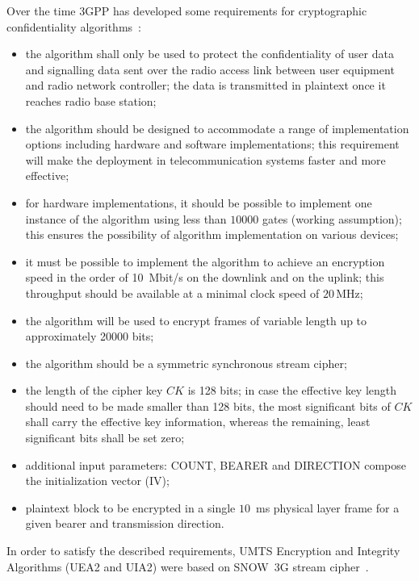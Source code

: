 Over the time 3GPP has developed some requirements for cryptographic
confidentiality algorithms~\cite{3gpp:uea2_doc5}:
\begin{itemize}
    \item the algorithm shall only be used to protect the confidentiality of user
        data and signalling data sent over the radio access link between user
        equipment and radio network controller; the data is
        transmitted in plaintext once it reaches radio base station;
    \item the algorithm should be designed to accommodate a range of implementation
        options including hardware and software implementations; this
        requirement will make the deployment in telecommunication systems faster
        and more effective;
    \item for hardware implementations, it should be possible to implement one
        instance of the algorithm using less than $10000$ gates (working
        assumption); this ensures the possibility of algorithm implementation on
        various devices;
    \item it must be possible to implement the algorithm to achieve an encryption
        speed in the order of 10~Mbit/s on the downlink and on the uplink; this
        throughput should be available at a minimal clock speed of 
        \mbox{$20 \, \text{MHz}$};  
    \item the algorithm will be used to encrypt frames
            of variable length up to approximately 20000 bits;
    \item the algorithm should be a symmetric synchronous stream cipher;
    \item the length of the cipher key $CK$ is 128 bits; in case the effective key
        length should need to be made smaller than 128 bits, the most significant
        bits of $CK$ shall carry the effective key information, whereas the remaining,
        least significant bits shall be set zero;
    \item additional input parameters: COUNT, BEARER and DIRECTION compose the
        initialization vector (IV);
    \item plaintext block to be encrypted in a single $10$~ms physical layer frame
        for a given bearer and transmission direction.
\end{itemize}

In order to satisfy the described requirements, UMTS Encryption and Integrity
Algorithms (UEA2 and UIA2) were based on SNOW~3G stream
cipher~\cite{3gpp:uea2_doc2}.

